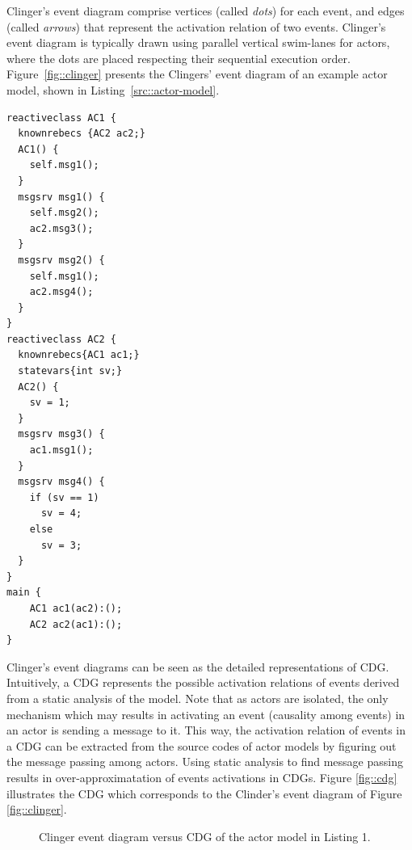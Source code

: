 Clinger's event diagram comprise vertices (called \emph{dots}) for each event, and edges (called \emph{arrows}) that represent the activation relation of two events. Clinger's event diagram is typically drawn using parallel vertical swim-lanes for actors, where the dots are placed respecting their sequential execution order. Figure~\ref{fig::clinger} presents the Clingers' event diagram of an example actor model, shown in Listing~\ref{src::actor-model}. 

\begin{lstlisting}[language=rebeca, caption=An example of a simple actor model, label=src::actor-model]
reactiveclass AC1 {
  knownrebecs {AC2 ac2;}
  AC1() {
    self.msg1();
  }
  msgsrv msg1() {
    self.msg2();
    ac2.msg3();
  }
  msgsrv msg2() {
    self.msg1();
    ac2.msg4();
  }
}
reactiveclass AC2 {
  knownrebecs{AC1 ac1;}
  statevars{int sv;}
  AC2() {
    sv = 1;
  }
  msgsrv msg3() {
    ac1.msg1();
  }
  msgsrv msg4() {
    if (sv == 1)
      sv = 4;
    else
      sv = 3;
  }
}
main {
    AC1 ac1(ac2):();
    AC2 ac2(ac1):();
}
\end{lstlisting}

Clinger's event diagrams can be seen as the detailed representations of CDG. Intuitively, a CDG represents the possible activation relations of events derived from a static analysis of the model. Note that as actors are isolated, the only mechanism which may results in activating an event (causality among events) in an actor is sending a message to it. This way, the activation relation of events in a CDG can be extracted from the source codes of actor models by figuring out the message passing among actors. Using static analysis to find message passing results in over-approximatation of events activations in CDGs. Figure \ref{fig::cdg} illustrates the CDG which corresponds to the Clinder's event diagram of Figure \ref{fig::clinger}.

\begin{figure}
\centering
{}
\qquad
{}
\caption{Clinger event diagram versus CDG of the actor model in Listing 1.}
\label{fig::clinger-cdg}
\end{figure}

